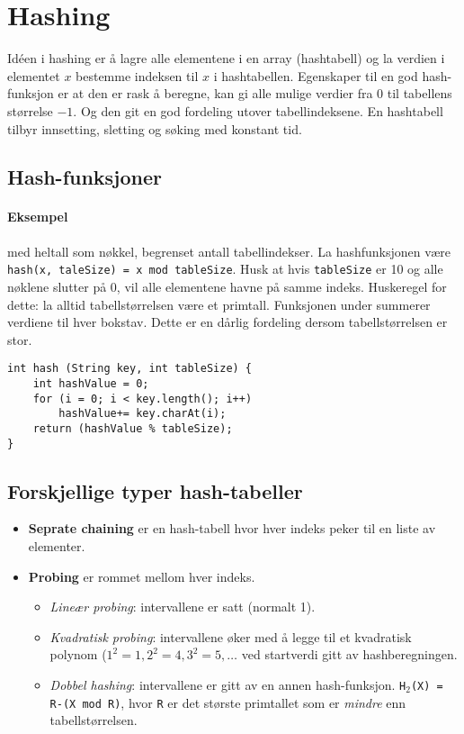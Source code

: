 \documentclass[11pt,a4paper]{article}
\theoremstyle{def}
\begin{document}
\newpage

\section{Hashing}
Idéen i hashing er å lagre alle elementene i en array (hashtabell) og la verdien i elementet $x$ bestemme indeksen til $x$ i hashtabellen. Egenskaper til en god hash-funksjon er at den er rask å beregne, kan gi alle mulige verdier fra 0 til tabellens størrelse $-1$. Og den git en god fordeling utover tabellindeksene. En hashtabell tilbyr innsetting, sletting og søking med konstant tid.

\subsection{Hash-funksjoner}
\paragraph{Eksempel} med heltall som nøkkel, begrenset antall tabellindekser. La hashfunksjonen være \texttt{hash(x, taleSize) = x mod tableSize}. Husk at hvis \texttt{tableSize} er 10 og alle nøklene slutter på 0, vil alle elementene havne på samme indeks. Huskeregel for dette: la alltid tabellstørrelsen være et primtall. Funksjonen under summerer verdiene til hver bokstav. Dette er en dårlig fordeling dersom tabellstørrelsen er stor.
\begin{lstlisting}
int hash (String key, int tableSize) {
	int hashValue = 0;
	for (i = 0; i < key.length(); i++) 
		hashValue+= key.charAt(i);
	return (hashValue % tableSize);
}
\end{lstlisting}
\vspace{-45pt}

\subsection{Forskjellige typer hash-tabeller}
\begin{itemize}
\item
\textbf{Seprate chaining} er en hash-tabell hvor hver indeks peker til en liste av elementer.
\item
\textbf{Probing} er rommet mellom hver indeks.
\begin{itemize}
\item
\textit{Lineær probing}: intervallene er satt (normalt 1).
\item
\textit{Kvadratisk probing}: intervallene øker med å legge til et kvadratisk polynom ($1^2=1, 2^2=4, 3^2=5,\dots$ ved startverdi gitt av hashberegningen.
\item
\textit{Dobbel hashing}: intervallene er gitt av en annen hash-funksjon. \texttt{H$_2$(X) = R-(X mod R)}, hvor \texttt{R} er det største primtallet som er \textit{mindre} enn tabellstørrelsen.
\end{itemize}
\end{itemize}
\end{document}

